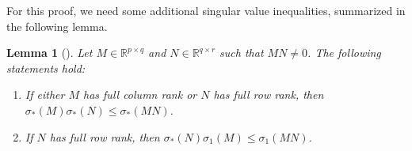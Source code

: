 \documentclass[journal,twoside,web]{ieeecolor}
\newtheorem{lemma}[theorem]{Lemma}
\begin{document}
For this proof, we need some additional singular value inequalities, summarized in the following lemma.

\begin{lemma}[{\cite[Lem. 4.4 \& 4.5]{grcar2010matrix}}]
\label{lem:grcar}
Let $M\in\mathbb{R}^{p\times q}$ and $N\in\mathbb{R}^{q\times r}$ such that $MN\neq 0$. The following statements hold:
\begin{enumerate}[label=(\alph*),ref=\ref{lem:grcar}(\alph*)]
    \item\label{lem:grcar(a)} If either $M$ has full column rank or $N$ has full row rank, then $\sigma_*(M)\sigma_*(N)\leq \sigma_*(MN)$.
    \item\label{lem:grcar(c)} If $N$ has full row rank, then \mbox{$\sigma_*(N)\sigma_1(M)\leq\sigma_1(MN)$}.
\end{enumerate}
\end{lemma}
\end{document}
